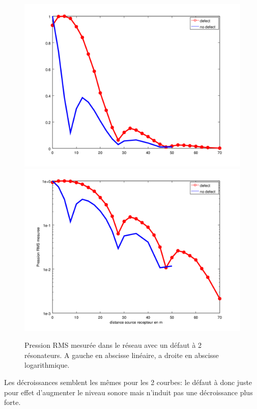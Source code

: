 \begin{figure}[!h]
\centering
\includegraphics[scale=0.3]{./images_chp3/comparaison_decroissance_lin.png}\hfill
\includegraphics[scale=0.3]{./images_chp3/comparaison_decroissance_log.png}
\caption{\label{_tube} Pression RMS mesurée dans le réseau avec un défaut à 2 résonateurs. A gauche en abscisse linéaire, a droite en abscisse logarithmique.}
\end{figure}

Les décroissances semblent les mêmes pour les 2 courbes: le défaut à donc juste pour effet d'augmenter le niveau sonore mais n'induit pas une décroissance plus forte.


